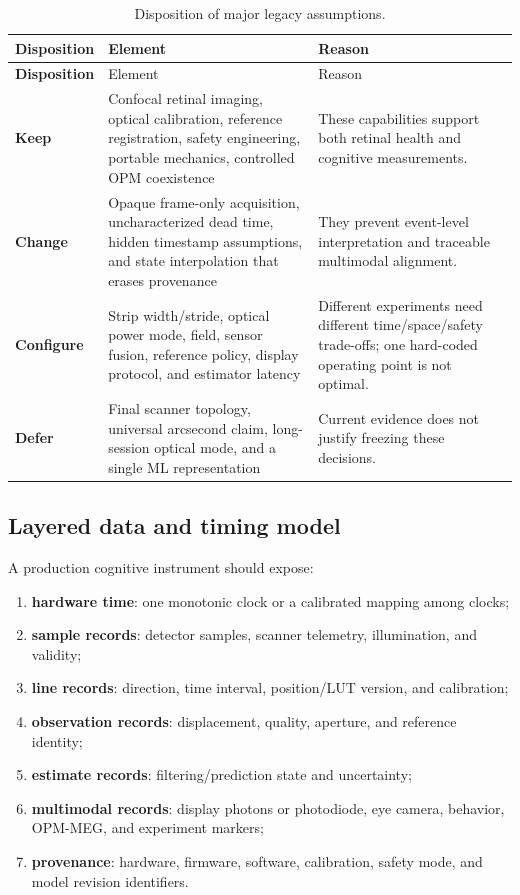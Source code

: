 \documentclass[11pt]{article}
\begin{document}
\begingroup
\setlength{\tabcolsep}{4pt}
\begin{longtable}{>{\bfseries}p{} p{} p{}}
\caption{Disposition of major legacy assumptions.}\label{tab:ledger}\\
\toprule
Disposition & Element & Reason\\
\midrule
\endfirsthead
\toprule
Disposition & Element & Reason\\
\midrule
\endhead
Keep & Confocal retinal imaging, optical calibration, reference registration, safety engineering,
portable mechanics, controlled OPM coexistence & These capabilities support both retinal health
and cognitive measurements.\\
Change & Opaque frame-only acquisition, uncharacterized dead time, hidden timestamp assumptions,
and state interpolation that erases provenance & They prevent event-level interpretation and
traceable multimodal alignment.\\
Configure & Strip width/stride, optical power mode, field, sensor fusion, reference policy,
display protocol, and estimator latency & Different experiments need different time/space/safety
trade-offs; one hard-coded operating point is not optimal.\\
Defer & Final scanner topology, universal arcsecond claim, long-session optical mode, and a single
ML representation & Current evidence does not justify freezing these decisions.\\
\bottomrule
\end{longtable}
\endgroup

\subsection{Layered data and timing model}

A production cognitive instrument should expose:
\begin{enumerate}
  \item \textbf{hardware time}: one monotonic clock or a calibrated mapping among clocks;
  \item \textbf{sample records}: detector samples, scanner telemetry, illumination, and validity;
  \item \textbf{line records}: direction, time interval, position/LUT version, and calibration;
  \item \textbf{observation records}: displacement, quality, aperture, and reference identity;
  \item \textbf{estimate records}: filtering/prediction state and uncertainty;
  \item \textbf{multimodal records}: display photons or photodiode, eye camera, behavior, OPM-MEG,
  and experiment markers;
  \item \textbf{provenance}: hardware, firmware, software, calibration, safety mode, and model
  revision identifiers.
\end{enumerate}
\end{document}
